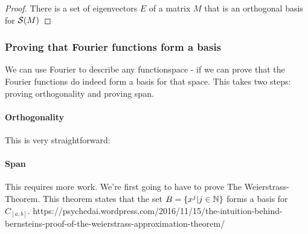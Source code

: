 \begin{proof}There is a set of eigenvectors $E$ of a matrix $M$ that is an orthogonal basis for $\mathcal{S}(M)$
    \subprf{}{}{}
\end{proof}



\subsubsection{Proving that Fourier functions form a basis}

We can use Fourier to describe any functionspace - if we can prove that the Fourier functions do indeed form a basis for that space. This takes two steps: proving orthogonality and proving span.

\paragraph{Orthogonality} This is very straightforward: 

\paragraph{Span} This  requires more work.  We're first going to have to prove The Weierstrass-Theorem. This theorem states that the set $B = \{ x^j | j \in \mathbb{N} \}$ forms a basis for $C_{[a,b]}$.
https://psychedai.wordpress.com/2016/11/15/the-intuition-behind-bernsteins-proof-of-the-weierstrass-approximation-theorem/



